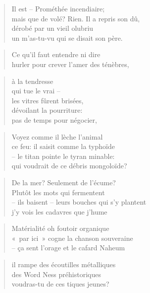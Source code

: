   \begin{verse}
    Il est -- Prométhée incendiaire;\\
    mais que de volé? Rien. Il a repris son dû,\\
    dérobé par un vieil olubriu\\
    un m’as-tu-vu qui se disait son père.
  \end{verse}
  \begin{verse}
    Ce qu’il faut entendre ni dire\\
    hurler pour crever l’amer des ténèbres,
  \end{verse}
  \begin{verse}
     à la tendresse\\
    qui tue le vrai --\\
    les vitres fûrent brisées,\\
    dévoilant la pourriture:\\
    pas de temps pour négocier,
  \end{verse}
  \begin{verse}
  \end{verse}
  \begin{verse}
    Voyez comme il lèche l’animal\\
    ce feu: il saisit comme la typhoïde\\
    -- le titan pointe le tyran minable:\\
    qui voudrait de ce débris mongoloïde?
  \end{verse}

\newpage
{}
  \begin{verse}
    De la mer? Seulement de l’écume?\\
    Plutôt les mots qui fermentent\\
    -- ils baisent -- leurs bouches qui s’y plantent\\
    j’y vois les cadavres que j’hume
  \end{verse}
  \begin{verse}
    Matérialité oh foutoir organique\\
    «~par ici~» cogne la chanson souveraine\\
    -- ça sent l’orage et le cafard Naheum
  \end{verse}
  \begin{verse}
    il rampe des écoutilles métalliques\\
    des Word Ness préhistoriques\\
    voudras-tu de ces tiques jeunes?
  \end{verse}

